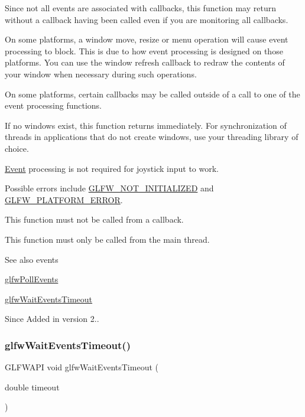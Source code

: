 Since not all events are associated with callbacks, this function may return without a callback having been called even if you are monitoring all callbacks.

On some platforms, a window move, resize or menu operation will cause event processing to block. This is due to how event processing is designed on those platforms. You can use the window refresh callback to redraw the contents of your window when necessary during such operations.

On some platforms, certain callbacks may be called outside of a call to one of the event processing functions.

If no windows exist, this function returns immediately. For synchronization of threads in applications that do not create windows, use your threading library of choice.

\hyperlink{classEvent}{Event} processing is not required for joystick input to work.

Possible errors include \hyperlink{group__errors_ga2374ee02c177f12e1fa76ff3ed15e14a}{G\+L\+F\+W\+\_\+\+N\+O\+T\+\_\+\+I\+N\+I\+T\+I\+A\+L\+I\+Z\+ED} and \hyperlink{group__errors_gad44162d78100ea5e87cdd38426b8c7a1}{G\+L\+F\+W\+\_\+\+P\+L\+A\+T\+F\+O\+R\+M\+\_\+\+E\+R\+R\+OR}.

This function must not be called from a callback.

This function must only be called from the main thread.

\begin{DoxySeeAlso}{See also}
events 

\hyperlink{group__window_ga872d16e4c77f58c0436f356255920cfc}{glfw\+Poll\+Events} 

\hyperlink{group__window_ga05223a0a4c5e50f10f289e60398153aa}{glfw\+Wait\+Events\+Timeout}
\end{DoxySeeAlso}
\begin{DoxySince}{Since}
Added in version 2.. 
\end{DoxySince}
\mbox{\label{group__window_ga05223a0a4c5e50f10f289e60398153aa}} 
\subsubsection{\texorpdfstring{glfw\+Wait\+Events\+Timeout()}{glfwWaitEventsTimeout()}}
{\footnotesize\ttfamily G\+L\+F\+W\+A\+PI void glfw\+Wait\+Events\+Timeout (\begin{DoxyParamCaption}\item[{double}]{timeout }\end{DoxyParamCaption})}



